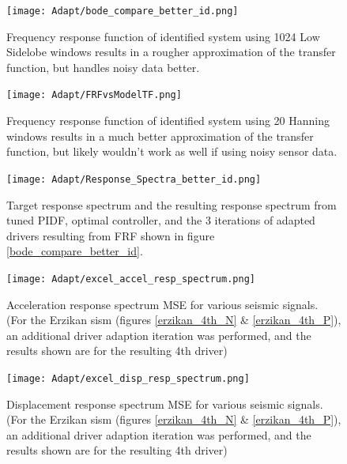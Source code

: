 \documentclass[9pt]{extarticle}
\begin{document}
\begin{figure}[H]
\begin{minipage}{0.49\textwidth}
    \texttt{[image: Adapt/bode\_compare\_better\_id.png]}
    \caption{Frequency response function of identified system using 1024 Low Sidelobe windows results in a rougher approximation of the transfer function, but handles noisy data better.}
    \label{bode_compare_better_id}
\end{minipage}
\hfill
\begin{minipage}{0.48\textwidth}
    \texttt{[image: Adapt/FRFvsModelTF.png]}
    \caption{Frequency response function of identified system using 20 Hanning windows results in a much better approximation of the transfer function, but likely wouldn't work as well if using noisy sensor data.}
    \label{FRFvsModelTF}
\end{minipage}
\end{figure}


\begin{figure}[H]
    \centering
    \texttt{[image: Adapt/Response\_Spectra\_better\_id.png]}
    \caption{Target response spectrum and the resulting response spectrum from tuned PIDF, optimal controller, and the 3 iterations of adapted drivers resulting from FRF shown in figure \ref{bode_compare_better_id}.}
    \label{Response_Spectra_better_id}
\end{figure}


\begin{figure}[H]
    \centering
    \texttt{[image: Adapt/excel\_accel\_resp\_spectrum.png]}
    \caption{Acceleration response spectrum MSE for various seismic signals. (For the Erzikan sism (figures \ref{erzikan_4th_N} \& \ref{erzikan_4th_P}), an additional driver adaption iteration was performed, and the results shown are for the resulting 4th driver)}
    \label{excel_accel_resp_spectrum}
\end{figure}

\begin{figure}[H]
    \centering
    \texttt{[image: Adapt/excel\_disp\_resp\_spectrum.png]}
    \caption{Displacement response spectrum MSE for various seismic signals. (For the Erzikan sism (figures \ref{erzikan_4th_N} \& \ref{erzikan_4th_P}), an additional driver adaption iteration was performed, and the results shown are for the resulting 4th driver)}
    \label{excel_disp_resp_spectrum}
\end{figure}
\end{document}
